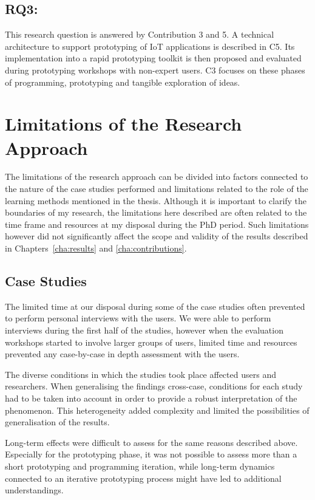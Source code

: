 \subsection*{RQ3: \RQiii}
\label{rq3}
This research question is answered by Contribution 3 and 5. A technical architecture to support prototyping of IoT applications is described in C5. Its implementation into a rapid prototyping toolkit is then proposed and evaluated during prototyping workshops with non-expert users. C3 focuses on these phases of programming, prototyping and tangible exploration of ideas.


\section{Limitations of the Research Approach}

The limitations of the research approach can be divided into factors connected to the nature of the case studies performed and limitations related to the role of the learning methods mentioned in the thesis. Although it is important to clarify the boundaries of my research, the limitations here described are often related to the time frame and resources at my disposal during the PhD period. Such limitations however did not significantly affect the scope and validity of the results described in Chapters~\ref{cha:results} and \ref{cha:contributions}.

\subsection{Case Studies}
The limited time at our disposal during some of the case studies often prevented to perform personal interviews with the users. We were able to perform interviews during the first half of the studies, however when the evaluation workshops started to involve larger groups of users, limited time and resources prevented any case-by-case in depth assessment with the users.

The diverse conditions in which the studies took place affected users and researchers. When generalising the findings cross-case, conditions for each study had to be taken into account in order to provide a robust interpretation of the phenomenon. This heterogeneity added complexity and limited the possibilities of generalisation of the results.

Long-term effects were difficult to assess for the same reasons described above. Especially for the prototyping phase, it was not possible to assess more than a short prototyping and programming iteration, while long-term dynamics connected to an iterative prototyping process might have led to additional understandings.

